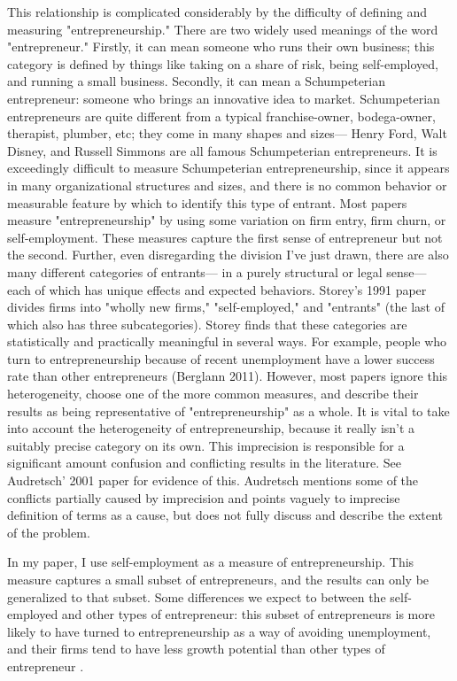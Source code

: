 \documentclass[]{ecca}
\begin{document}
This relationship is complicated considerably by the difficulty of defining and measuring "entrepreneurship." There are two widely used meanings of the word "entrepreneur." Firstly, it can mean someone who runs their own business; this category is defined by things like taking on a share of risk, being self-employed, and running a small business. Secondly, it can mean a Schumpeterian entrepreneur: someone who brings an innovative idea to market. Schumpeterian entrepreneurs are quite different from a typical franchise-owner, bodega-owner, therapist, plumber, etc; they come in many shapes and sizes---  Henry Ford, Walt Disney, and Russell Simmons are all famous Schumpeterian entrepreneurs. It is exceedingly difficult to measure Schumpeterian entrepreneurship, since it appears in many organizational structures and sizes, and there is no common behavior or measurable feature by which to identify this type of entrant. Most papers measure "entrepreneurship" by using some variation on firm entry, firm churn, or self-employment. These measures capture the first sense of entrepreneur but not the second. Further, even disregarding the division I've just drawn, there are also many different categories of entrants--- in a purely structural or legal sense--- each of which has unique effects and expected behaviors. Storey's 1991 paper divides firms into "wholly new firms," "self-employed," and "entrants" (the last of which also has three subcategories). Storey finds that these categories are statistically and practically meaningful in several ways. For example, people who turn to entrepreneurship because of recent unemployment have a lower success rate than other entrepreneurs (Berglann 2011). However, most papers ignore this heterogeneity, choose one of the more common measures, and describe their results as being representative of "entrepreneurship" as a whole. It is vital to take into account the heterogeneity of entrepreneurship, because it really isn't a suitably precise category on its own. This imprecision is responsible for a significant amount confusion and conflicting results in the literature. See Audretsch' 2001 paper for evidence of this. Audretsch mentions some of the conflicts partially caused by imprecision and points vaguely to imprecise definition of terms as a cause, but does not fully discuss and describe the extent of the problem. 

In my paper, I use self-employment as a measure of entrepreneurship. This measure captures a small subset of entrepreneurs, and the results can only be generalized to that subset. Some differences we expect to between the self-employed and other types of entrepreneur: this subset of entrepreneurs is more likely to have turned to entrepreneurship as a way of avoiding unemployment, and their firms tend to have less growth potential than other types of entrepreneur \citep{berglann11, gries09}.
\end{document}
